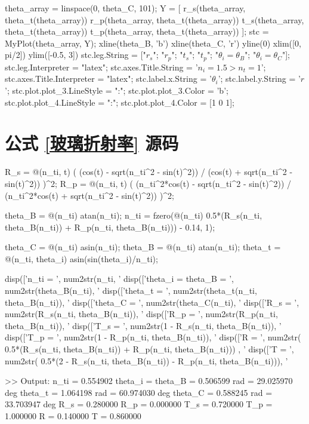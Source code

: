 \documentclass[UTF8]{report}
\theoremstyle{MyLineTheoremStyle} %
\theoremstyle{MyBlockTheoremStyle} %
\theoremstyle{MySubsubsectionStyle} %
\begin{document}
\begin{matlablisting}
theta_array = linspace(0, theta_C, 101);
Y = [
    r_s(theta_array, theta_t(theta_array))
    r_p(theta_array, theta_t(theta_array))
    t_s(theta_array, theta_t(theta_array))
    t_p(theta_array, theta_t(theta_array))
    ];
stc = MyPlot(theta_array, Y);
xline(theta_B, 'b')
xline(theta_C, 'r')
yline(0)
xlim([0, pi/2])
ylim([-0.5, 3])
stc.leg.String = ["$r_s$"; "$r_p$"; "$t_s$"; "$t_p$"; "$\theta_i = \theta_B$"; "$\theta_i = \theta_C$"];
stc.leg.Interpreter = "latex";
stc.axes.Title.String = '$n_i = 1.5 > n_t = 1$';
stc.axes.Title.Interpreter = "latex";
stc.label.x.String = '$\theta_i$';
stc.label.y.String = '$r$';
stc.plot.plot_3.LineStyle = ":";
stc.plot.plot_3.Color = 'b';
stc.plot.plot_4.LineStyle = ":";
stc.plot.plot_4.Color = [1 0 1];
\end{matlablisting}

\section{公式 \ref{玻璃折射率} 源码}\label{玻璃折射率源码}

\begin{matlablisting}
R_s = @(n_ti, t) ( (cos(t) - sqrt(n_ti^2 - sin(t)^2)) / (cos(t) + sqrt(n_ti^2 - sin(t)^2)) )^2;
R_p = @(n_ti, t) ( (n_ti^2*cos(t) - sqrt(n_ti^2 - sin(t)^2)) / (n_ti^2*cos(t) + sqrt(n_ti^2 - sin(t)^2)) )^2;

theta_B = @(n_ti) atan(n_ti);
n_ti = fzero(@(n_ti) 0.5*(R_s(n_ti, theta_B(n_ti)) + R_p(n_ti, theta_B(n_ti))) - 0.14, 1);

theta_C = @(n_ti) asin(n_ti);
theta_B = @(n_ti) atan(n_ti);
theta_t = @(n_ti, theta_i) asin(sin(theta_i)/n_ti);

disp(['n_ti = ', num2str(n_ti, '%
disp(['theta_i = theta_B = ', num2str(theta_B(n_ti), '%
disp(['theta_t = ', num2str(theta_t(n_ti, theta_B(n_ti)), '%
disp(['theta_C = ', num2str(theta_C(n_ti), '%
disp(['R_s = ', num2str(R_s(n_ti, theta_B(n_ti)), '%
disp(['R_p = ', num2str(R_p(n_ti, theta_B(n_ti)), '%
disp(['T_s = ', num2str(1 - R_s(n_ti, theta_B(n_ti)), '%
disp(['T_p = ', num2str(1 - R_p(n_ti, theta_B(n_ti)), '%
disp(['R = ', num2str( 0.5*(R_s(n_ti, theta_B(n_ti)) + R_p(n_ti, theta_B(n_ti))) , '%
disp(['T = ', num2str( 0.5*(2 - R_s(n_ti, theta_B(n_ti)) - R_p(n_ti, theta_B(n_ti))), '%


>> Output:
n_ti = 0.554902
theta_i = theta_B = 0.506599 rad = 29.025970 deg
theta_t = 1.064198 rad = 60.974030 deg
theta_C = 0.588245 rad = 33.703947 deg
R_s = 0.280000
R_p = 0.000000
T_s = 0.720000
T_p = 1.000000
R = 0.140000
T = 0.860000
\end{matlablisting}
\end{document}

